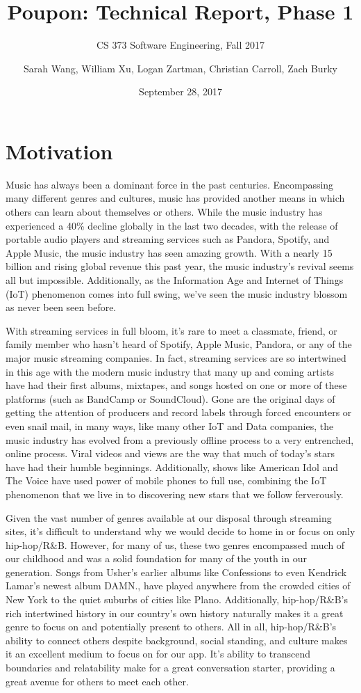 \documentclass{scrartcl}
\title{Poupon: Technical Report, Phase 1}
\subtitle{CS 373 Software Engineering, Fall 2017}
\author{Sarah Wang, William Xu, Logan Zartman, Christian Carroll, Zach Burky}
\date{September 28, 2017}
\begin{document}
\maketitle

\tableofcontents

\newpage
\section{Motivation}
\indent
Music has always been a dominant force in the past centuries. Encompassing many different genres and cultures, music has provided another means in which others can learn about themselves or others. While the music industry has experienced a 40\% decline globally in the last two decades, with the release of portable audio players and streaming services such as Pandora, Spotify, and Apple Music, the music industry has seen amazing growth. With a nearly 15 billion and rising global revenue this past year, the music industry’s revival seems all but impossible. Additionally, as the Information Age and Internet of Things (IoT) phenomenon comes into full swing, we’ve seen the music industry blossom as never been seen before.

With streaming services in full bloom, it’s rare to meet a classmate, friend, or family member who hasn’t heard of Spotify, Apple Music, Pandora, or any of the major music streaming companies. In fact, streaming services are so intertwined in this age with the modern music industry that many up and coming artists have had their first albums, mixtapes, and songs hosted on one or more of these platforms (such as BandCamp or SoundCloud). Gone are the original days of getting the attention of producers and record labels through forced encounters or even snail mail, in many ways, like many other IoT and Data companies, the music industry has evolved from a previously offline process to a very entrenched, online process. Viral videos and views are the way that much of today’s stars have had their humble beginnings. Additionally, shows like American Idol and The Voice have used power of mobile phones to full use, combining the IoT phenomenon that we live in to discovering new stars that we follow ferverously.

Given the vast number of genres available at our disposal through streaming sites, it’s difficult to understand why we would decide to home in or focus on only hip-hop/R\&B. However, for many of us, these two genres encompassed much of our childhood and was a solid foundation for many of the youth in our generation. Songs from Usher’s earlier albums like Confessions to even Kendrick Lamar’s newest album DAMN., have played anywhere from the crowded cities of New York to the quiet suburbs of cities like Plano. Additionally, hip-hop/R\&B’s rich intertwined history in our country’s own history naturally makes it a great genre to focus on and potentially present to others. All in all, hip-hop/R\&B’s ability to connect others despite background, social standing, and culture makes it an excellent medium to focus on for our app. It’s ability to transcend boundaries and relatability make for a great conversation starter, providing a great avenue for others to meet each other.
\end{document}
